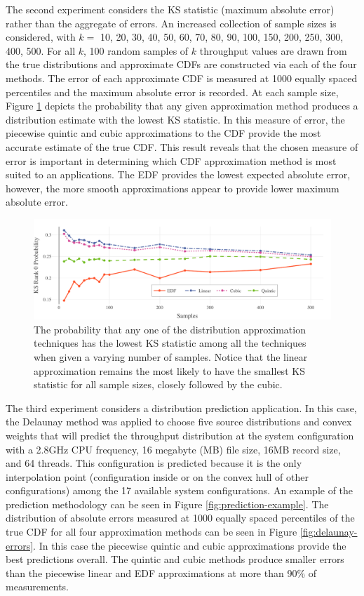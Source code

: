 \documentclass[letterpaper, 10 pt, conference]{IEEEtran}  %
\begin{document}
The second experiment considers the KS statistic (maximum absolute error) rather than the aggregate of errors. An increased collection of sample sizes is considered, with $k =$ 10, 20, 30, 40, 50, 60, 70, 80, 90, 100, 150, 200, 250, 300, 400, 500. For all $k$, 100 random samples of $k$ throughput values are drawn from the true distributions and approximate CDFs are constructed via each of the four methods. The error of each approximate CDF is measured at 1000 equally spaced percentiles and the maximum absolute error is recorded. At each sample size, Figure \ref{fig:ks-rank-0} depicts the probability that any given approximation method produces a distribution estimate with the lowest KS statistic. In this measure of error, the piecewise quintic and cubic approximations to the CDF provide the most accurate estimate of the true CDF. This result reveals that the chosen measure of error is important in determining which CDF approximation method is most suited to an applications. The EDF provides the lowest expected absolute error, however, the more smooth approximations appear to provide lower maximum absolute error.

\begin{figure}
  \vspace{-.3cm}
  \includegraphics[width=1\textwidth]{KS-rank-0-probability.pdf}
  \caption{The probability that any one of the distribution approximation techniques has the lowest KS statistic among all the techniques when given a varying number of samples. Notice that the linear approximation remains the most likely to have the smallest KS statistic for all sample sizes, closely followed by the cubic.
  \vspace{-.5cm}}
  \label{fig:ks-rank-0}
\end{figure}


The third experiment considers a distribution prediction application. In this case, the Delaunay method was applied to choose five source distributions and convex weights that will predict the throughput distribution at the system configuration with a 2.8GHz CPU frequency, 16 megabyte (MB) file size, 16MB record size, and 64 threads. This configuration is predicted because it is the only interpolation point (configuration inside or on the convex hull of other configurations) among the 17 available system configurations. An example of the prediction methodology can be seen in Figure \ref{fig:prediction-example}. The distribution of absolute errors measured at 1000 equally spaced percentiles of the true CDF for all four approximation methods can be seen in Figure \ref{fig:delaunay-errors}. In this case the piecewise quintic and cubic approximations provide the best predictions overall. The quintic and cubic methods produce smaller errors than the piecewise linear and EDF approximations at more than 90\% of measurements.
\end{document}
